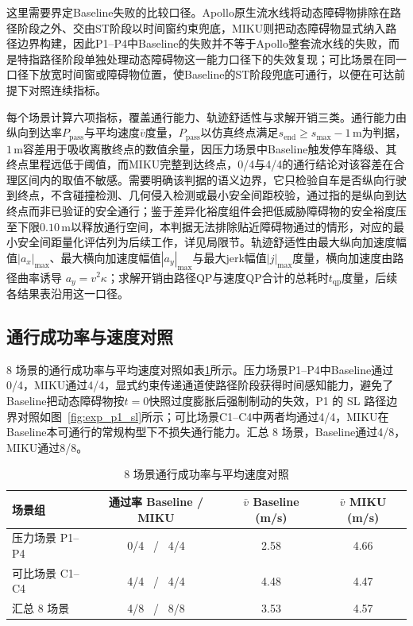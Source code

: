 \documentclass[a4paper,zihao=5]{ctexart}
\theoremstyle{definition}
\begin{document}
这里需要界定Baseline失败的比较口径。Apollo原生流水线将动态障碍物排除在路径阶段之外、交由ST阶段以时间窗约束兜底，MIKU则把动态障碍物显式纳入路径边界构建，因此P1--P4中Baseline的失败并不等于Apollo整套流水线的失败，而是特指路径阶段单独处理动态障碍物这一能力口径下的失效复现；可比场景在同一口径下放宽时间窗或障碍物位置，使Baseline的ST阶段兜底可通行，以便在可达前提下对照连续指标。

每个场景计算六项指标，覆盖通行能力、轨迹舒适性与求解开销三类。通行能力由纵向到达率$P_{\mathrm{pass}}$与平均速度$\bar v$度量，$P_{\mathrm{pass}}$以仿真终点满足$s_{\mathrm{end}} \geq s_{\max} - 1$\,m为判据，$1$\,m容差用于吸收离散终点的数值余量，因压力场景中Baseline触发停车降级、其终点里程远低于阈值，而MIKU完整到达终点，0/4与4/4的通行结论对该容差在合理区间内的取值不敏感。需要明确该判据的语义边界，它只检验自车是否纵向行驶到终点，不含碰撞检测、几何侵入检测或最小安全间距校验，通过指的是纵向到达终点而非已验证的安全通行；鉴于差异化裕度组件会把低威胁障碍物的安全裕度压至下限$0.10$\,m以释放通行空间，本判据无法排除贴近障碍物通过的情形，对应的最小安全间距量化评估列为后续工作，详见局限节。轨迹舒适性由最大纵向加速度幅值$|a_x|_{\max}$、最大横向加速度幅值$|a_y|_{\max}$与最大jerk幅值$|j|_{\max}$度量，横向加速度由路径曲率诱导 $a_y = v^2 \kappa$；求解开销由路径QP与速度QP合计的总耗时$t_{\mathrm{qp}}$度量，后续各结果表沿用这一口径。

\subsection{通行成功率与速度对照}
\label{subsec:exp_passrate}

8 场景的通行成功率与平均速度对照如表\ref{tab:exp_pass}所示。压力场景P1--P4中Baseline通过0/4，MIKU通过4/4，显式约束传递通道使路径阶段获得时间感知能力，避免了Baseline把动态障碍物按$t=0$快照过度膨胀后强制制动的失效，P1 的 SL 路径边界对照如图~\ref{fig:exp_p1_sl}所示；可比场景C1--C4中两者均通过4/4，MIKU在Baseline本可通行的常规构型下不损失通行能力。汇总 8 场景，Baseline通过4/8，MIKU通过8/8。

\begin{table}[htbp]
\centering
\caption{8 场景通行成功率与平均速度对照}
\label{tab:exp_pass}
\small
\begin{tabular}{lccc}
\toprule
\textbf{场景组} & \textbf{通过率 Baseline / MIKU} & \textbf{$\bar v$ Baseline (m/s)} & \textbf{$\bar v$ MIKU (m/s)} \\
\midrule
压力场景 P1--P4 & 0/4 \ / \ 4/4 & 2.58 & 4.66 \\
可比场景 C1--C4 & 4/4 \ / \ 4/4 & 4.48 & 4.47 \\
\midrule
汇总 8 场景 & 4/8 \ / \ 8/8 & 3.53 & 4.57 \\
\bottomrule
\end{tabular}
\end{table}
\end{document}
